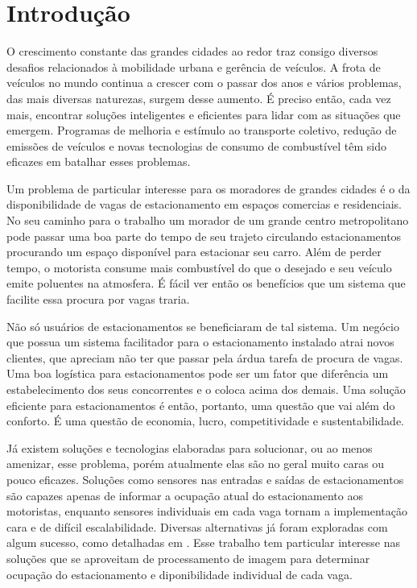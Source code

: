 \chapter{Introdução}

O crescimento constante das grandes cidades ao redor traz consigo diversos desafios relacionados à mobilidade urbana e gerência de veículos. A frota de veículos no mundo continua a crescer com o passar dos anos e vários problemas, das mais diversas naturezas, surgem desse aumento. É preciso então, cada vez mais, encontrar soluções inteligentes e eficientes para lidar com as situações que emergem. Programas de melhoria e estímulo ao transporte coletivo, redução de emissões de veículos e novas tecnologias de consumo de combustível têm sido eficazes em batalhar esses problemas.

Um problema de particular interesse para os moradores de grandes cidades é o da disponibilidade de vagas de estacionamento em espaços comercias e residenciais. No seu caminho para o trabalho um morador de um grande centro metropolitano pode passar uma boa parte do tempo de seu trajeto circulando estacionamentos procurando um espaço disponível para estacionar seu carro. Além de perder tempo, o motorista consume mais combustível do que o desejado e seu veículo emite poluentes na atmosfera. É fácil ver então os benefícios que um sistema que facilite essa procura por vagas traria.

Não só usuários de estacionamentos se beneficiaram de tal sistema. Um negócio que possua um sistema facilitador para o estacionamento instalado atrai novos clientes, que apreciam não ter que passar pela árdua tarefa de procura de vagas. Uma boa logística para estacionamentos pode ser um fator que diferência um estabelecimento dos seus concorrentes e o coloca acima dos demais. Uma solução eficiente para estacionamentos é então, portanto, uma questão que vai além do conforto. É uma questão de economia, lucro, competitividade e sustentabilidade.

Já existem soluções e tecnologias elaboradas para solucionar, ou ao menos amenizar, esse problema, porém atualmente elas são no geral muito caras ou pouco eficazes. Soluções como sensores nas entradas e saídas de estacionamentos são capazes apenas de informar a ocupação atual do estacionamento aos motoristas, enquanto sensores individuais em cada vaga tornam a implementação cara e de difícil escalabilidade. Diversas alternativas já foram exploradas com algum sucesso, como detalhadas em \cite{idris09}. Esse trabalho tem particular interesse nas soluções que se aproveitam de processamento de imagem para determinar ocupação do estacionamento e diponibilidade individual de cada vaga.

